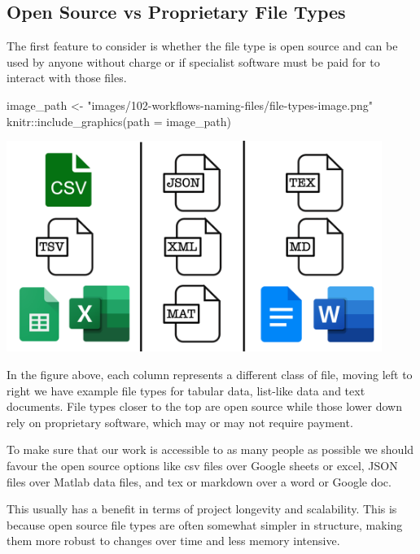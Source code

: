 \documentclass[
  letterpaper,
  DIV=11,
  numbers=noendperiod]{scrreprt}
\newenvironment{Shaded}{\begin{snugshade}}{\end{snugshade}}
\newcommand{\AttributeTok}[1]{\textcolor[rgb]{0.40,0.45,0.13}{#1}}
\newcommand{\FunctionTok}[1]{\textcolor[rgb]{0.28,0.35,0.67}{#1}}
\newcommand{\NormalTok}[1]{\textcolor[rgb]{0.00,0.23,0.31}{#1}}
\newcommand{\OtherTok}[1]{\textcolor[rgb]{0.00,0.23,0.31}{#1}}
\newcommand{\SpecialCharTok}[1]{\textcolor[rgb]{0.37,0.37,0.37}{#1}}
\newcommand{\StringTok}[1]{\textcolor[rgb]{0.13,0.47,0.30}{#1}}
\begin{document}
\subsection{Open Source vs Proprietary File
Types}\label{open-source-vs-proprietary-file-types}

The first feature to consider is whether the file type is open source
and can be used by anyone without charge or if specialist software must
be paid for to interact with those files.

\begin{Shaded}
\begin{Highlighting}[]
\NormalTok{image\_path }\OtherTok{\textless{}{-}} \StringTok{"images/102{-}workflows{-}naming{-}files/file{-}types{-}image.png"}
\NormalTok{knitr}\SpecialCharTok{::}\FunctionTok{include\_graphics}\NormalTok{(}\AttributeTok{path =}\NormalTok{ image\_path)}
\end{Highlighting}
\end{Shaded}

\includegraphics[width=4.8in,height=\textheight]{images/102-workflows-naming-files/file-types-image.png}

In the figure above, each column represents a different class of file,
moving left to right we have example file types for tabular data,
list-like data and text documents. File types closer to the top are open
source while those lower down rely on proprietary software, which may or
may not require payment.

To make sure that our work is accessible to as many people as possible
we should favour the open source options like csv files over Google
sheets or excel, JSON files over Matlab data files, and tex or markdown
over a word or Google doc.

This usually has a benefit in terms of project longevity and
scalability. This is because open source file types are often somewhat
simpler in structure, making them more robust to changes over time and
less memory intensive.
\end{document}

